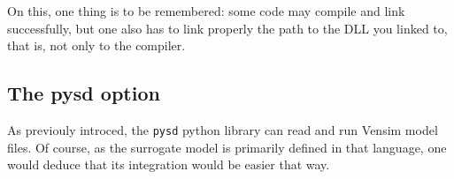 On this, one thing is to be remembered: some code may compile and link successfully, but one also has to link properly the path to the DLL you linked to, that is, not only to the compiler.









\subsection{The pysd option}

As previouly introced, the \texttt{pysd} python library can read and run Vensim model files. Of course, as the surrogate model is primarily defined in that language, one would deduce that its integration would be easier that way.


